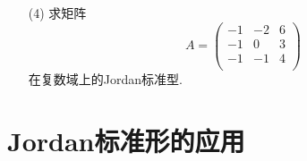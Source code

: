 \begin{itemize}
\begin{itemize}
    \item [(4)]
    求矩阵
    \begin{equation}
    \nonumber
    A = 
    \begin{pmatrix}
    -1 & -2& 6\\
    -1 &  0& 3\\
    -1 & -1& 4\\
    \end{pmatrix}
    \end{equation}
    在复数域上的Jordan标准型.
    \vspace{3cm}
    \end{itemize}
\end{itemize}

\section{Jordan标准形的应用}
